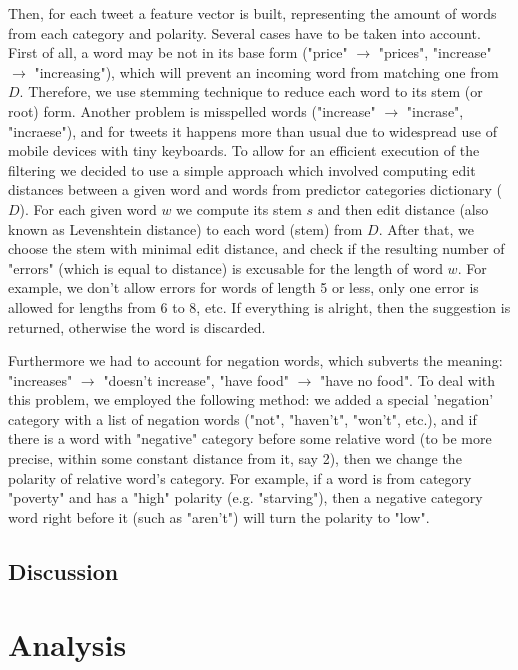\documentclass[12pt]{report}
\begin{document}
Then, for each tweet a feature vector is built, representing the amount of words from each category and polarity. Several cases have to be taken into account. First of all, a word may be not in its base form ("price" $\to$ "prices", "increase" $\to$ "increasing"), which will prevent an incoming word from matching one from $D$. Therefore, we use stemming technique to reduce each word to its stem (or root) form. Another problem is misspelled words ("increase" $\to$ "incrase", "incraese"), and for tweets it happens more than usual due to widespread use of mobile devices with tiny keyboards. To allow for an efficient execution of the filtering  we decided to use a simple approach which involved computing edit distances between a given word and words from predictor categories dictionary ($D$).
For each given word $w$ we compute its stem $s$ and then edit distance (also known as Levenshtein distance) to each word (stem) from $D$.
After that, we choose the stem with minimal edit distance, and check if the resulting number of "errors" (which is equal to distance) is excusable for the length of word $w$. For example, we don't allow errors for words of length 5 or less, only one error is allowed for lengths from 6 to 8, etc. If everything is alright, then the suggestion is returned, otherwise the word is discarded. 

Furthermore we had to account for negation words, which subverts the meaning: "increases" $\to$ "doesn't increase", "have food" $\to$ "have no food".  To deal with this problem, we employed the following method: we added a special 'negation' category with a list of negation words ("not", "haven't", "won't", etc.), and if there is a word with "negative" category before some relative word (to be more precise, within some constant distance from it, say 2), then we change the polarity of relative word's category. For example, if a word is from category "poverty" and has a "high" polarity (e.g. "starving"), then a negative category word right before it (such as "aren't") will turn the polarity to "low".


\section {Discussion}




\chapter{Analysis}
\end{document}
